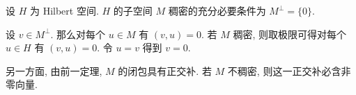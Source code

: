 \begin{Corollary}
\label{cor:hilbert-density-orthogonal-complement}
设 $H$ 为 Hilbert 空间. $H$ 的子空间 $M$ 稠密的充分必要条件为 $M^\perp=\{0\}$.
\end{Corollary}

\begin{Proof}
设 $v\in M^\perp$. 那么对每个 $u\in M$ 有 $(v,u)=0$. 若 $M$ 稠密, 则取极限可得对每个 $u\in H$ 有 $(v,u)=0$. 令 $u=v$ 得到 $v=0$.

另一方面, 由前一定理, $M$ 的闭包具有正交补. 若 $M$ 不稠密, 则这一正交补必含非零向量.
\end{Proof}
